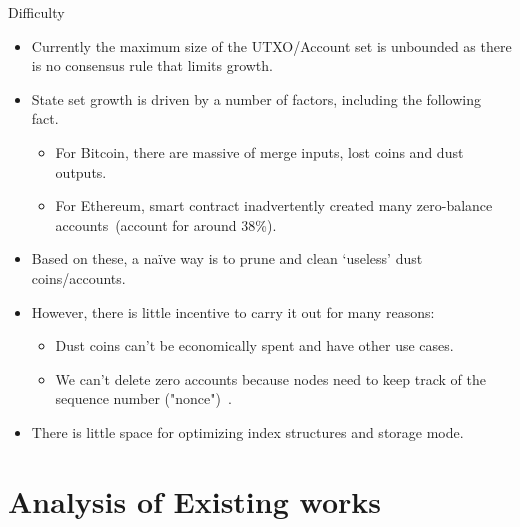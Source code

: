 \documentclass[biblatex,aspectratio=169,11pt]{mybeamer}
\begin{document}
\begin{frame}{Difficulty}
  \begin{itemize}
    \item Currently the maximum size of the UTXO/Account set is unbounded as there is no consensus rule that limits growth.
    \item State set growth is driven by a number of factors, including the following fact.
     \begin{itemize}
       \item For \alert{Bitcoin}, there are massive of merge inputs, lost coins and dust outputs.
       \item For \alert{Ethereum}, smart contract inadvertently created many \alert{zero-balance accounts}~(account for around 38\%).
     \end{itemize}
    \item Based on these, a na\"ive way is to prune and clean `useless' dust coins/accounts.
    \item However, there is little incentive to carry it out for many reasons:
     \begin{itemize}
       \item Dust coins can't be economically spent and have other use cases.
       \item We can't delete zero accounts because nodes need to keep track of the sequence number ("nonce")~\cite{wood2014ethereum}.
     \end{itemize}
    \item There is little space for optimizing index structures and storage mode.
  \end{itemize}
\end{frame}

\section{Analysis of Existing works}
\end{document}
